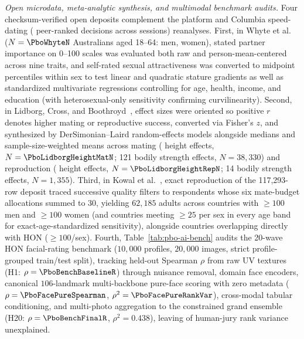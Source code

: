 \emph{Open microdata, meta-analytic synthesis, and multimodal benchmark audits.} Four checksum-verified open deposits
complement the platform and Columbia speed-dating (\PboSpeedN{} peer-ranked decisions across \PboSpeedSessions{} sessions)
reanalyses. First, in Whyte et al.~\cite{whyte2021} ($N=\PboWhyteN$ Australians aged 18--64: \PboWhyteMenN{} men,
\PboWhyteWomenN{} women), stated partner importance on 0--100 scales was evaluated both raw and person-mean-centered across
nine traits, and self-rated sexual attractiveness was converted to midpoint percentiles within sex to test linear and
quadratic stature gradients as well as standardized multivariate regressions controlling for age, health, income, and
education (with heterosexual-only sensitivity confirming curvilinearity). Second, in Lidborg, Cross, and
Boothroyd~\cite{lidborg2022}, effect sizes were oriented so positive $r$ denotes higher mating or reproductive success,
converted via Fisher's $z$, and synthesized by DerSimonian--Laird random-effects models alongside medians and
sample-size-weighted means across mating (\PboLidborgHeightMatK{} height effects, $N=\PboLidborgHeightMatN$; 121 bodily
strength effects, $N=38{,}330$) and reproduction (\PboLidborgHeightRepK{} height effects, $N=\PboLidborgHeightRepN$; 14
bodily strength effects, $N=1{,}355$). Third, in Kowal et al.~\cite{kowal2025}, exact reproduction of the 117,293-row
deposit traced successive quality filters to \PboKowalBudgetN{} respondents whose six mate-budget allocations summed to 30,
yielding $62{,}185$ adults across \PboKowalCountryN{} countries with $\ge 100$ men and $\ge 100$ women (and
\PboKowalStdCountryN{} countries meeting $\ge 25$ per sex in every age band for exact-age-standardized sensitivity),
alongside \PboKowalBridgeN{} countries overlapping directly with HON ($\ge 100$/sex). Fourth, Table~\ref{tab:pbo-ai-bench}
audits the 20-wave HON facial-rating benchmark ($10{,}000$ profiles, $20{,}000$ images, strict profile-grouped train/test
split), tracking held-out Spearman $\rho$ from raw UV textures (H1: $\rho=\PboBenchBaselineR$) through nuisance removal,
domain face encoders, canonical $106$-landmark multi-backbone pure-face scoring with zero metadata
($\rho=\PboFacePureSpearman$, $\rho^2=\PboFacePureRankVar$), cross-modal tabular conditioning, and multi-photo aggregation to
the constrained grand ensemble (H20: $\rho=\PboBenchFinalR$, $\rho^2=0.438$), leaving \PboBenchUnexplainedPct{} of
human-jury rank variance unexplained.

